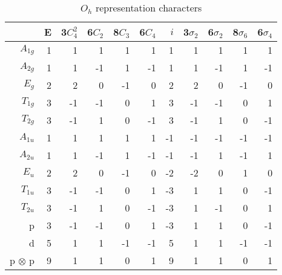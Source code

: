 \documentclass[preprint,showpacs,preprintnumbers,superscriptaddress,prb,floatfix,aps]{revtex4-1}
\begin{document}
\begin{table}
\caption{\label{tab:fonts} $O_h$ representation characters}
\begin{ruledtabular}
\begin{tabular}{rrrrrrrrrrr}
              &  E  &3$C_4^2$& 6$C_2$ & 8$C_3$ & 6$C_4$ &  $i$ & 3$\sigma_2$ & 6$\sigma_2$ & 8$\sigma_6$ & 6$\sigma_4$ \\ \hline
$A_{1g}$      &  1  &     1  &     1  &     1  &     1  &   1  &          1  &          1  &          1  &          1  \\         %
$A_{2g}$      &  1  &     1  &    -1  &     1  &    -1  &   1  &          1  &         -1  &          1  &         -1  \\         %
$E_g   $      &  2  &     2  &     0  &    -1  &     0  &   2  &          2  &          0  &         -1  &          0  \\         %
$T_{1g}$      &  3  &    -1  &    -1  &     0  &     1  &   3  &         -1  &         -1  &          0  &          1  \\         %
$T_{2g}$      &  3  &    -1  &     1  &     0  &    -1  &   3  &         -1  &          1  &          0  &         -1  \\         %
$A_{1u}$      &  1  &     1  &     1  &     1  &     1  &  -1  &         -1  &         -1  &         -1  &         -1  \\         %
$A_{2u}$      &  1  &     1  &    -1  &     1  &    -1  &  -1  &         -1  &          1  &         -1  &          1  \\         %
$E_u   $      &  2  &     2  &     0  &    -1  &     0  &  -2  &         -2  &          0  &          1  &          0  \\         %
$T_{1u}$      &  3  &    -1  &    -1  &     0  &     1  &  -3  &          1  &          1  &          0  &         -1  \\         %
$T_{2u}$      &  3  &    -1  &     1  &     0  &    -1  &  -3  &          1  &         -1  &          0  &          1  \\ \hline  %
p             &  3  &     -1 &    -1  &     0  &     1  &  -3  &          1  &          1  &          0  &         -1  \\
d             &  5  &      1 &     1  &    -1  &    -1  &   5  &          1  &          1  &         -1  &         -1  \\
p $\otimes$ p &  9  &      1 &     1  &     0  &     1  &   9  &          1  &          1  &          0  &          1  \\

\end{tabular}
\end{ruledtabular}
\end{table}
\end{document}
